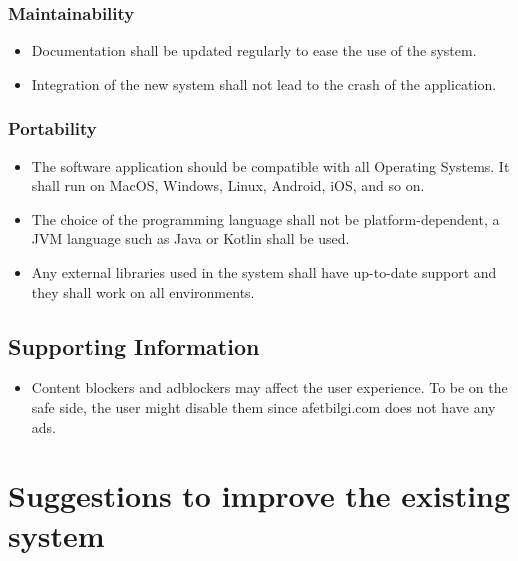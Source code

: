 \documentclass[listof=nochaptergap]{report}
\begin{document}
\subsection{Maintainability}
\begin{itemize}
    \item Documentation shall be updated regularly to ease the use of the system.
    \item Integration of the new system shall not lead to the crash of the application.
\end{itemize}

\subsection{Portability}
\begin{itemize}
    \item The software application should be compatible with all Operating Systems. It shall run on MacOS, Windows, Linux, Android, iOS, and so on.
    \item The choice of the programming language shall not be platform-dependent, a JVM language such as Java or Kotlin shall be used.
    \item Any external libraries used in the system shall have up-to-date support and they shall work on all environments.
\end{itemize}

\section{Supporting Information}
\begin{itemize}
    \item Content blockers and adblockers may affect the user experience. To be on the safe side, the user might disable them since afetbilgi.com does not have any ads.
\end{itemize}

\chapter{Suggestions to improve the existing system}
\end{document}

